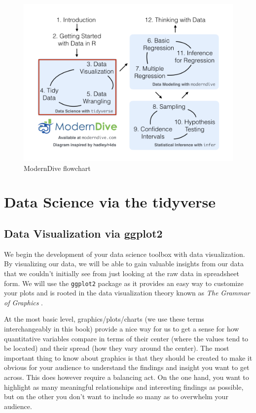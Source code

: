 \documentclass[12pt,]{krantz}
\begin{document}
\begin{figure}

{\centering \includegraphics[width=1.1\linewidth]{images/flowcharts/flowchart/flowchart.004} 

}

\caption{ModernDive flowchart}\label{fig:unnamed-chunk-10}
\end{figure}

\part{Data Science via the
tidyverse}\label{part-data-science-via-the-tidyverse}

\chapter{Data Visualization via ggplot2}\label{viz}

We begin the development of your data science toolbox with data
visualization. By visualizing our data, we will be able to gain valuable
insights from our data that we couldn't initially see from just looking
at the raw data in spreadsheet form. We will use the \texttt{ggplot2}
package as it provides an easy way to customize your plots and is rooted
in the data visualization theory known as \emph{The Grammar of Graphics}
\citep{wilkinson2005}.

At the most basic level, graphics/plots/charts (we use these terms
interchangeably in this book) provide a nice way for us to get a sense
for how quantitative variables compare in terms of their center (where
the values tend to be located) and their spread (how they vary around
the center). The most important thing to know about graphics is that
they should be created to make it obvious for your audience to
understand the findings and insight you want to get across. This does
however require a balancing act. On the one hand, you want to highlight
as many meaningful relationships and interesting findings as possible,
but on the other you don't want to include so many as to overwhelm your
audience.
\end{document}
